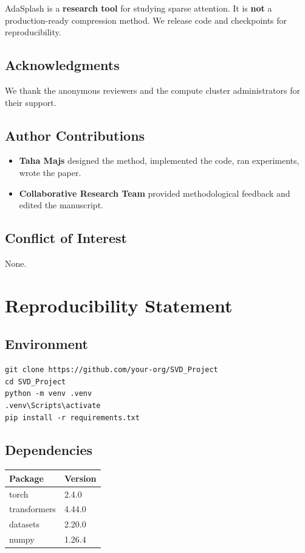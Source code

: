 AdaSplash is a \textbf{research tool} for studying sparse attention. It is 
\textbf{not} a production-ready compression method. We release code and checkpoints 
for reproducibility.

\subsection{Acknowledgments}

We thank the anonymous reviewers and the compute cluster administrators for their support.

\subsection{Author Contributions}

\begin{itemize}
\item \textbf{Taha Majs} designed the method, implemented the code, ran experiments,
  wrote the paper.
\item \textbf{Collaborative Research Team} provided methodological feedback and edited the manuscript.

\end{itemize}
\subsection{Conflict of Interest}

None.


\section{Reproducibility Statement}

\subsection{Environment}

\begin{lstlisting}
git clone https://github.com/your-org/SVD_Project
cd SVD_Project
python -m venv .venv
.venv\Scripts\activate
pip install -r requirements.txt
\end{lstlisting}

\subsection{Dependencies}

\begin{table}[H]
\centering
\small
\begin{tabular}{ll}
\toprule
\textbf{Package} & \textbf{Version} \\
\midrule
torch & 2.4.0 \\
transformers & 4.44.0 \\
datasets & 2.20.0 \\
numpy & 1.26.4 \\
\bottomrule
\end{tabular}
\end{table}

